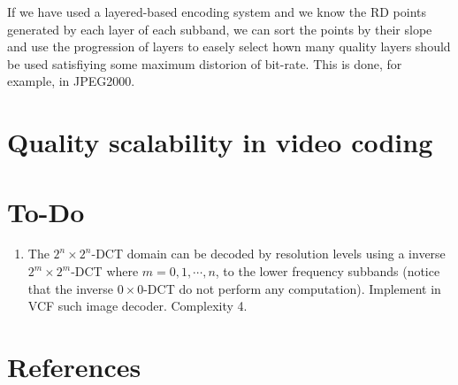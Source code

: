 If we have used a layered-based encoding system and we know the RD
points generated by each layer of each subband, we can sort the points
by their slope and use the progression of layers to easely select hown
many quality layers should be used satisfiying some maximum distorion
of bit-rate. This is done, for example, in JPEG2000.

\section{Quality scalability in video coding}

\section{To-Do}
\begin{enumerate}
\item The $2^n\times 2^n$-DCT domain can be decoded by resolution
  levels using a inverse $2^m\times 2^m$-DCT where $m=0,1,\cdots,n$,
  to the lower frequency subbands (notice that the inverse
  $0\times 0$-DCT do not perform any computation). Implement in VCF
  such image decoder. Complexity 4.
\end{enumerate}

\section{References}

\renewcommand{\addcontentsline}[3]{}%

